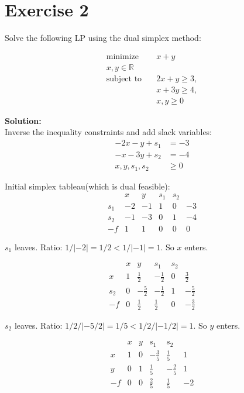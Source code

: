 \documentclass{article}
\begin{document}
\section*{Exercise 2}
Solve the following LP using the dual simplex method:

\begin{align*}
\text{minimize} \quad & x + y\\
x, y \in \mathbb{R} \quad & \\
\text{subject to} \quad & 2x + y \geq 3,\\
& x + 3y \geq 4,\\
& x, y \geq 0
\end{align*}

\textbf{Solution:} \\

Inverse the inequality constraints and add slack variables:
\begin{align*}
-2x - y + s_1 &= -3\\
-x - 3y + s_2 &= -4\\
x, y, s_1, s_2 &\geq 0
\end{align*}

Initial simplex tableau(which is dual feasible):
$$
\begin{array}{c|cccc|c}
 & x & y & s_1 & s_2 &  \\
\hline
s_1 & -2 & -1 & 1 & 0 & -3 \\
s_2 & -1 & -3 & 0 & 1 & -4 \\
\hline
-f & 1 & 1 & 0 & 0 & 0
\end{array}
$$

$s_1$ leaves. Ratio: $1 / |-2| = 1/2 < 1 / |-1| = 1$. So $x$ enters.

$$
\begin{array}{c|cccc|c}
 & x & y & s_1 & s_2 &  \\
\hline
x & 1 & \frac{1}{2} & -\frac{1}{2} & 0 & \frac{3}{2} \\
s_2 & 0 & -\frac{5}{2} & -\frac{1}{2} & 1 & -\frac{5}{2} \\
\hline
-f & 0 & \frac{1}{2} & \frac{1}{2} & 0 & -\frac{3}{2}
\end{array}
$$

$s_2$ leaves. Ratio: $1 / 2 / |-5/2| = 1/5 < 1 / 2 / |- 1 / 2| = 1$. So $y$ enters.

$$
\begin{array}{c|cccc|c}
 & x & y & s_1 & s_2 &  \\
\hline
x & 1 & 0 & -\frac{3}{5} & \frac{1}{5} & 1 \\
y & 0 & 1 & \frac{1}{5} & -\frac{2}{5} & 1 \\
\hline
-f & 0 & 0 & \frac{2}{5} & \frac{1}{5} & -2
\end{array}
$$
\end{document}
